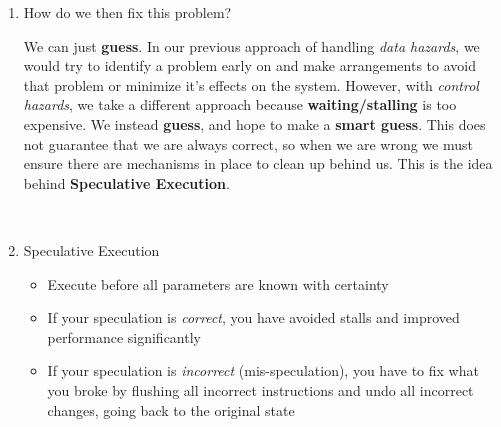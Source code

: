 \documentclass[12pt]{article}
\newenvironment{QandA}{\begin{enumerate}[label=\bfseries\arabic*.]\bfseries}
                      {\end{enumerate}}
\newenvironment{answered}{\par\quad\normalfont}{}
\begin{document}
\begin{QandA}
\begin{answered}
\begin{itemize}
    \item Lastly, building upon the first challenge - when the processor is handling a Branch instruction, it is usually Fetched and then moves onto the \textit{Decode Stage}. But what should we be doing in the \textit{Fetch Stage} next? Logically, we will have to fetch the next instruction in the sequence. But if the previous instruction was indeed a \textbf{Branch} instruction, we should be going to the \textit{target} in the next cycle instead of the next sequential instruction. This is another fundamental problem in handling \textbf{Branch} instructions. \textit{We don't yet know what the right thing to do is, but we have to do something!}. We can \textit{not do anything} but that would then indicate a 3 cycle stall/gap, which isn't good for performance.
\end{itemize}
\end{answered}

\

\item How do we then fix this problem?
\begin{answered}
    We can just \textbf{guess}. In our previous approach of handling \textit{data hazards}, we would try to identify a problem early on and make arrangements to avoid that problem or minimize it's effects on the system. However, with \textit{control hazards}, we take a different approach because \textbf{waiting/stalling} is too expensive. We instead \textbf{guess}, and hope to make a \textbf{smart guess}. This does not guarantee that we are always correct, so when we are wrong we must ensure there are mechanisms in place to clean up behind us. This is the idea behind \textbf{Speculative Execution}.
\end{answered}

\ 

\item Speculative Execution
\vspace{-0.85cm}
\begin{answered}
\begin{itemize}
    \item Execute before all parameters are known with certainty
    \item If your speculation is \textit{correct}, you have avoided stalls and improved performance significantly
    \item If your speculation is \textit{incorrect} (mis-speculation), you have to fix what you broke by flushing all incorrect instructions and undo all incorrect changes, going back to the original state
\end{itemize}
\end{answered}


\end{QandA}
\end{document}
